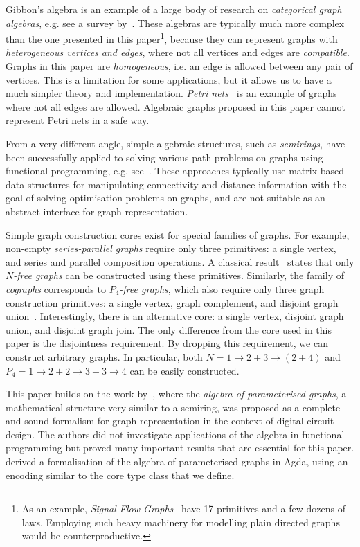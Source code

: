 Gibbon's algebra is an example of a large body of research on \emph{categorical
graph algebras}, e.g. see a survey by~\citet{2010_selinger_survey}. These algebras
are typically much more complex than the one presented in this paper\footnote{As an
example, \emph{Signal Flow Graphs}~\cite{2015_bonchi_sfg} have 17 primitives
and a few dozens of laws. Employing such heavy machinery for modelling plain directed
graphs would be counterproductive.},
because they can represent graphs with
\emph{heterogeneous vertices and edges}, where not all vertices
and edges are \emph{compatible}. Graphs in this paper are \emph{homogeneous}, i.e.
an edge is allowed between any pair of vertices. This is a limitation for some
applications, but it allows us to have a much simpler theory and implementation.
\emph{Petri nets}~\cite{1989_murata_pn} is an example of graphs where not all
edges are allowed. Algebraic graphs proposed in this paper cannot represent Petri
nets in a safe way.

From a very different angle, simple algebraic structures, such as \emph{semirings},
have been successfully applied to solving various path problems on graphs using
functional programming, e.g. see~\citet{2013_semirings_dolan}. These approaches
typically use matrix-based data structures for manipulating connectivity and distance
information with the goal of solving optimisation problems on graphs, and are not
suitable as an abstract interface for graph representation.

Simple graph construction cores exist for special families of graphs. For example,
non-empty \emph{series-parallel graphs} require only three primitives: a single vertex,
and series and parallel composition operations. A classical result~\cite{1979_valdes_sp}
states that only \emph{$N$-free graphs} can be constructed using these primitives.
Similarly, the family of \emph{cographs} corresponds to \emph{$P_4$-free graphs}, which
also require only three graph construction primitives: a single vertex, graph complement,
and disjoint graph union~\cite{1981_corneil_cographs}. Interestingly, there is an
alternative core: a single vertex, disjoint graph union, and disjoint graph join. The
only difference from the core used in this paper is the disjointness requirement. By
dropping this requirement, we can construct arbitrary graphs. In particular, both
$N = 1 \rightarrow 2 + 3 \rightarrow (2 + 4)$ and
$P_4 = 1 \rightarrow 2 + 2 \rightarrow 3 + 3 \rightarrow 4$ can be easily constructed.

This paper builds on the work by~\citet{2014_algebra_mokhov}, where
the \emph{algebra of parameterised graphs}, a mathematical
structure very similar to a semiring, was proposed as a complete and sound formalism
for graph representation in the context of digital circuit design. The authors did
not investigate applications of the algebra in functional programming but proved
many important results that are essential for this paper.
\citet{2014_alekseyev_phd} derived a formalisation of the algebra of parameterised
graphs in Agda, using an encoding similar to the core type class that we define.

